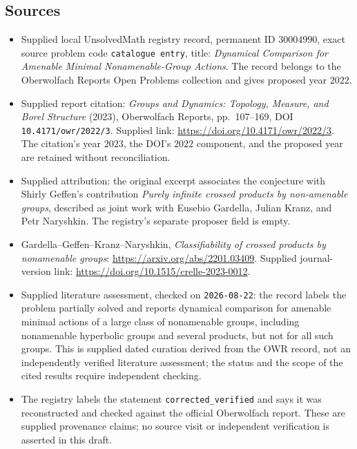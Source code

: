 \documentclass[11pt]{article}
\begin{document}
\subsection{Sources}
\begin{itemize}
\item Supplied local UnsolvedMath registry record, permanent ID \(30004990\), exact source problem code \texttt{catalogue entry}, title: \emph{Dynamical Comparison for Amenable Minimal Nonamenable-Group Actions}. The record belongs to the Oberwolfach Reports Open Problems collection and gives proposed year \(2022\).
\item Supplied report citation: \emph{Groups and Dynamics: Topology, Measure, and Borel Structure} (2023), Oberwolfach Reports, pp.\ 107--169, DOI \texttt{10.4171/owr/2022/3}. Supplied link: \url{https://doi.org/10.4171/owr/2022/3}. The citation's year \(2023\), the DOI's \(2022\) component, and the proposed year are retained without reconciliation.
\item Supplied attribution: the original excerpt associates the conjecture with Shirly Geffen's contribution \emph{Purely infinite crossed products by non-amenable groups}, described as joint work with Eusebio Gardella, Julian Kranz, and Petr Naryshkin. The registry's separate proposer field is empty.
\item Gardella--Geffen--Kranz--Naryshkin, \emph{Classifiability of crossed products by nonamenable groups}: \url{https://arxiv.org/abs/2201.03409}. Supplied journal-version link: \url{https://doi.org/10.1515/crelle-2023-0012}.
\item Supplied literature assessment, checked on \texttt{2026-08-22}: the record labels the problem partially solved and reports dynamical comparison for amenable minimal actions of a large class of nonamenable groups, including nonamenable hyperbolic groups and several products, but not for all such groups. This is supplied dated curation derived from the OWR record, not an independently verified literature assessment; the status and the scope of the cited results require independent checking.
\item The registry labels the statement \texttt{corrected\_verified} and says it was reconstructed and checked against the official Oberwolfach report. These are supplied provenance claims; no source visit or independent verification is asserted in this draft.
\end{itemize}
\end{document}
